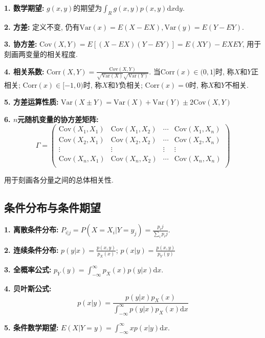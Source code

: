 \textbf{1. 数学期望: }$g(x,y)$的期望为$\int_R g(x,y)p(x,y)\mathrm{d}x\mathrm{d}y$.

\textbf{2. 方差: }定义不变, 仍有$\text{Var}(x)=E(X-EX),\text{Var}(y)=E(Y-EY)$.

\textbf{3. 协方差: }$\text{Cov}(X,Y)=E[(X-EX)(Y-EY)]=E(XY)-EXEY$, 用于刻画两变量的相关程度.

\textbf{4. 相关系数: }$\text{Corr}(X,Y)=\frac{\text{Cov}(X,Y)}{\sqrt{\text{Var}(X)}\sqrt{\text{Var}(Y)}}$. 当$\text{Corr}(x)\in (0,1]$时, 称$X$和$Y$正相关; $\text{Corr}(x)\in [-1,0)$时, 称$X$和$Y$负相关; $\text{Corr}(x)=0$时, 称$X$和$Y$不相关.

\textbf{5. 方差运算性质: }$\text{Var}(X\pm Y)=\text{Var}(X)+\text{Var}(Y)\pm 2\text{Cov}(X,Y)$

\textbf{6. $n$元随机变量的协方差矩阵: }\begin{equation*}
    \Gamma=\begin{pmatrix}
        \text{Cov}(X_1,X_1) & \text{Cov}(X_1,X_2)&\cdots&\text{Cov}(X_1,X_n)\\
        \text{Cov}(X_2,X_1) & \text{Cov}(X_2,X_2)&\cdots&\text{Cov}(X_2,X_n)\\
        \vdots &\vdots &\vdots &\vdots \\
        \text{Cov}(X_n,X_1) & \text{Cov}(X_n,X_2)&\cdots&\text{Cov}(X_n,X_n)\\
    \end{pmatrix}
\end{equation*}

用于刻画各分量之间的总体相关性.

\subsection{条件分布与条件期望}

\textbf{1. 离散条件分布: }$P_{i|j}=P(X=X_i|Y=y_j)=\frac{p_ij}{\sum\limits_i p_ij}$.

\textbf{2. 连续条件分布: }$p(y|x)=\frac{p(x,y)}{p_X(x)}$; $p(x|y)=\frac{p(x,y)}{p_Y(y)}$ 

\textbf{3. 全概率公式: }$p_Y(y)=\int_{-\infty}^\infty p_X(x)p(y|x)\mathrm{d}x$.

\textbf{4. 贝叶斯公式: }\begin{equation*}
    p(x|y)=\frac{p(y|x)p_X(x)}{\int_{-\infty}^\infty p(y|x)p_X(x)\mathrm{d}x}
\end{equation*}

\textbf{5. 条件数学期望: }$E(X|Y=y)=\int_{-\infty}^\infty xp(x|y)\mathrm{d}x$.

